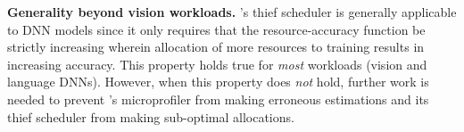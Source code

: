 {\textbf{Generality beyond vision workloads.} \name's thief scheduler is generally applicable to DNN models since it only requires that the resource-accuracy function be strictly increasing wherein allocation of more resources to training results in increasing accuracy. This property holds true for {\em most} workloads (vision and language DNNs). However, when this property does {\em not} hold, further work is needed to prevent \name{}'s microprofiler from making erroneous estimations and its thief scheduler from making sub-optimal allocations.
}